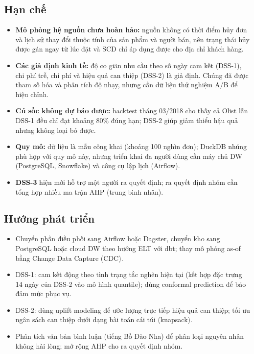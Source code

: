 \documentclass[a4paper]{article}
\begin{document}
\subsection{Hạn chế}
\begin{itemize}
    \item \textbf{Mô phỏng hệ nguồn chưa hoàn hảo:} nguồn không có thời điểm hủy đơn và lịch sử thay đổi thuộc tính của sản phẩm và người bán, nên trạng thái hủy được gán ngay từ lúc đặt và SCD chỉ áp dụng được cho địa chỉ khách hàng.
    \item \textbf{Các giả định kinh tế:} độ co giãn nhu cầu theo số ngày cam kết (DSS-1), chi phí trễ, chi phí và hiệu quả can thiệp (DSS-2) là giả định. Chúng đã được tham số hóa và phân tích độ nhạy, nhưng cần dữ liệu thử nghiệm A/B để hiệu chỉnh.
    \item \textbf{Cú sốc không dự báo được:} backtest tháng 03/2018 cho thấy cả Olist lẫn DSS-1 đều chỉ đạt khoảng 80\% đúng hạn; DSS-2 giúp giảm thiểu hậu quả nhưng không loại bỏ được.
    \item \textbf{Quy mô:} dữ liệu là mẫu công khai (khoảng 100 nghìn đơn); DuckDB nhúng phù hợp với quy mô này, nhưng triển khai đa người dùng cần máy chủ DW (PostgreSQL, Snowflake) và công cụ lập lịch (Airflow).
    \item \textbf{DSS-3} hiện mới hỗ trợ một người ra quyết định; ra quyết định nhóm cần tổng hợp nhiều ma trận AHP (trung bình nhân).
\end{itemize}

\subsection{Hướng phát triển}
\begin{itemize}
    \item Chuyển phần điều phối sang Airflow hoặc Dagster, chuyển kho sang PostgreSQL hoặc cloud DW theo hướng ELT với dbt; thay mô phỏng as-of bằng Change Data Capture (CDC).
    \item DSS-1: cam kết động theo tình trạng tắc nghẽn hiện tại (kết hợp đặc trưng 14 ngày của DSS-2 vào mô hình quantile); dùng conformal prediction để bảo đảm mức phục vụ.
    \item DSS-2: dùng uplift modeling để ước lượng trực tiếp hiệu quả can thiệp; tối ưu ngân sách can thiệp dưới dạng bài toán cái túi (knapsack).
    \item Phân tích văn bản bình luận (tiếng Bồ Đào Nha) để phân loại nguyên nhân không hài lòng; mở rộng AHP cho ra quyết định nhóm.
\end{itemize}
\end{document}
